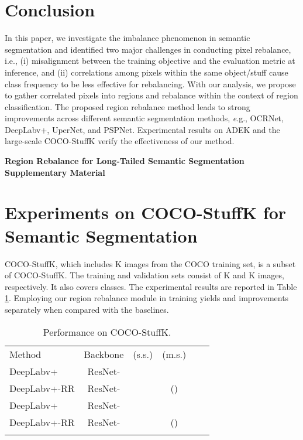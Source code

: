 \documentclass[final]{cvpr}
\begin{document}
\section{Conclusion}
\vspace{-0.1in}
In this paper, we investigate the imbalance phenomenon in semantic segmentation and identified two major challenges in conducting pixel rebalance, {i.e.}, (i) misalignment between the training objective and the  evaluation metric at inference, and (ii) correlations among pixels within the same object/stuff cause class frequency to be less effective for rebalancing. With our analysis, we propose to gather correlated pixels into regions and rebalance within the context of region classification. The proposed region rebalance method leads to strong improvements across different semantic segmentation methods, {\textit e.g.}, OCRNet, DeepLabv+, UperNet, and PSPNet. Experimental results on ADEK and the large-scale COCO-StuffK verify the effectiveness of our method. 


{\small


}


\newpage
\onecolumn
\appendix

\begin{center}
	\Large \textbf{Region Rebalance for Long-Tailed Semantic Segmentation}
	\Large \\ \textbf{Supplementary Material}
\end{center}
\vspace{20pt}


\section{Experiments on COCO-StuffK for Semantic Segmentation}
\noindent COCO-StuffK, which includes K images from the COCO training set, is a subset of COCO-StuffK. The training and validation sets consist of K and K images, respectively. It also covers  classes. The experimental results are reported in Table \ref{tab:main_cocostuff10k}.
Employing our region rebalance module in training yields   and   improvements separately when compared with the baselines.

\begin{table}[h]
	\centering
	\setlength{\tabcolsep}{20.0pt}
	\caption{Performance on COCO-StuffK.}
	\label{tab:main_cocostuff10k}
{
		\begin{tabular}{l|ccccc}
			\shline
			Method &Backbone  &(s.s.) &(m.s.) \\
			\shline
			DeepLabv+         &ResNet-  & &                 \\
			DeepLabv+-RR      &ResNet-  & &() \\
            DeepLabv+         &ResNet- & &                 \\
			DeepLabv+-RR      &ResNet- & &() \\
			\shline
		\end{tabular}
	}
\end{table}
\end{document}
